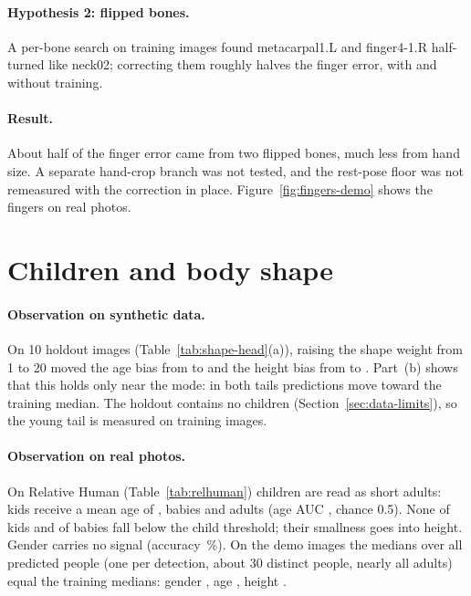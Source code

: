 \paragraph{Hypothesis 2: flipped bones.} A per-bone search on training images found metacarpal1.L and finger4-1.R
half-turned like neck02; correcting them roughly halves the finger error, with and without training.

\paragraph{Result.} About half of the finger error came from two flipped bones, much less from hand size. A
separate hand-crop branch was not tested, and the rest-pose floor was not remeasured with the correction in place. Figure~\ref{fig:fingers-demo} shows the fingers on real photos.

\section{Children and body shape}
\label{sec:diag-children}



\paragraph{Observation on synthetic data.} On 10 holdout images (Table~\ref{tab:shape-head}(a)), raising the shape
weight from 1 to 20 moved the age bias from \DiagShapeAgeBiasOld{}
to \DiagShapeAgeBiasNew{} and the height bias from \DiagShapeHeightBiasOld{} to \DiagShapeHeightBiasNew. Part~(b)
shows that this holds only near the mode: in both tails predictions move toward the training median. The holdout
contains no children (Section~\ref{sec:data-limits}), so the young tail is measured on training images.

\paragraph{Observation on real photos.} On Relative Human (Table~\ref{tab:relhuman}) children are read as short
adults: kids receive a mean age of \DiagRHKidAge, babies \DiagRHBabyAge{} and adults \DiagRHAdultAge{} (age
AUC \DiagRHAUC, chance 0.5). None of \DiagRHKids{} kids and \DiagRHBabiesBelow{} of \DiagRHBabies{} babies fall below
the child threshold; their smallness goes into height. Gender carries no signal (accuracy
\DiagRHGenderAcc\,\%). On the demo images the medians over all \DiagDemoShapeLines{} predicted people (one per detection, about 30
distinct people, nearly all adults) equal the training medians: gender \DiagDemoGenderMedian, age
\DiagDemoAgeMedian, height \DiagDemoHeightMedian.

